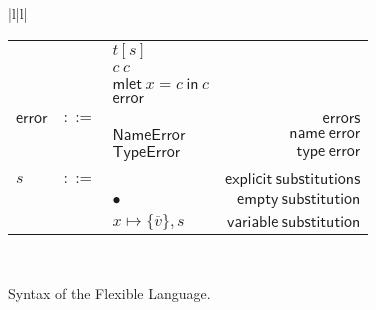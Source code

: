 \documentclass[preprint,authoryear,sort&compress,9pt,nocopyrightspace]{article}
\newcommand{\subx}{x \mapsto \{\overline{v}\},s}
\newcommand{\oletP}[3]{\mathsf{mlet} \ x = #2 \ \mathsf{in}  \ #3}
\newcommand{\errorA}{\mathsf{error}}
\newcommand{\nameerror}{\mathsf{NameError}}
\newcommand{\typeerror}{\mathsf{TypeError}}
\newcommand{\semanticA}{Flexible Language}
\begin{document}
\begin{figure}[h]
\begin{small}
\begin{center}
\begin{tabular}{|l|l|}
\begin{tabular}{l c l r}
&&$t[s]$&\\
&&$c \ c $&\\
&&$\oletP {T}{c}{c}$&\\
&&$\errorA$&\\
&&&\\
$\errorA$&$::=$&&$\mathsf {errors}$\\
&&$\nameerror$&$\mathsf {name \ error}$\\
&&$\typeerror$&$\mathsf {type \ error}$\\
&&&\\
$s$&$::=$&&$\mathsf {explicit \ substitutions}$\\
&&$ \bullet$&$\mathsf {empty \ substitution}$\\
&&$\subx$&$\mathsf {variable \ substitution}$\\
\end{tabular}\\
\hline
\end{tabular}
\hspace*{-2cm}
\caption{Syntax of the \semanticA.}
\label{figure:sintax1}
\end{center}
\end{small}
\end{figure}
\end{document}
